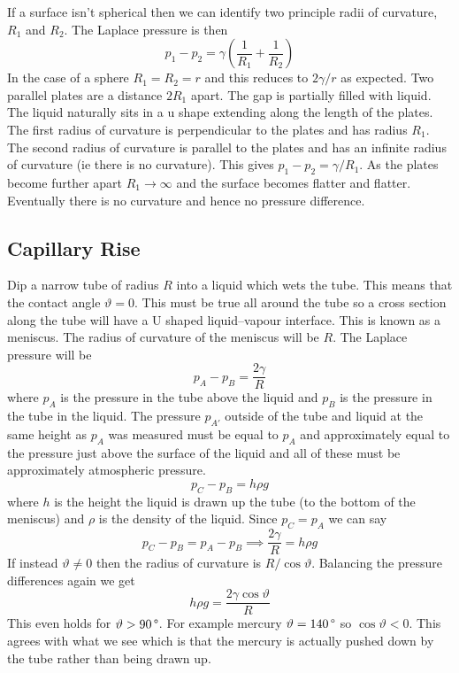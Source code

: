 \documentclass{article}
\begin{document}
    If a surface isn't spherical then we can identify two principle radii of curvature, \(R_1\) and \(R_2\).
    The Laplace pressure is then
    \[p_1 - p_2 = \gamma\left(\frac{1}{R_1} + \frac{1}{R_2}\right)\]
    In the case of a sphere \(R_1 = R_2 = r\) and this reduces to \(2\gamma/r\) as expected.
    Two parallel plates are a distance \(2R_1\) apart.
    The gap is partially filled with liquid.
    The liquid naturally sits in a u shape extending along the length of the plates.
    The first radius of curvature is perpendicular to the plates and has radius \(R_1\).
    The second radius of curvature is parallel to the plates and has an infinite radius of curvature (ie there is no curvature).
    This gives \(p_1 - p_2 = \gamma/R_1\).
    As the plates become further apart \(R_1\to\infty\) and the surface becomes flatter and flatter.
    Eventually there is no curvature and hence no pressure difference.
    
    \subsection{Capillary Rise}
    Dip a narrow tube of radius \(R\) into a liquid which wets the tube.
    This means that the contact angle \(\vartheta = 0\).
    This must be true all around the tube so a cross section along the tube will have a U shaped liquid--vapour interface.
    This is known as a meniscus.
    The radius of curvature of the meniscus will be \(R\).
    The Laplace pressure will be
    \[p_A - p_B = \frac{2\gamma}{R}\]
    where \(p_A\) is the pressure in the tube above the liquid and \(p_B\) is the pressure in the tube in the liquid.
    The pressure \(p_{A'}\) outside of the tube and liquid at the same height as \(p_A\) was measured must be equal to \(p_A\) and approximately equal to the pressure just above the surface of the liquid and all of these must be approximately atmospheric pressure.
    \[p_C - p_B = h\rho g\]
    where \(h\) is the height the liquid is drawn up the tube (to the bottom of the meniscus) and \(\rho\) is the density of the liquid.
    Since \(p_C = p_A\) we can say
    \[p_C - p_B = p_A - p_B \implies \frac{2\gamma}{R} = h\rho g\]
    If instead \(\vartheta\ne 0\) then the radius of curvature is \(R/\cos\vartheta\).
    Balancing the pressure differences again we get
    \[h\rho g = \frac{2\gamma\cos\vartheta}{R}\]
    This even holds for \(\vartheta > \SI{90}{\SIUnitSymbolDegree}\).
    For example mercury \(\vartheta = \SI{140}{\SIUnitSymbolDegree}\) so \(\cos\vartheta < 0\).
    This agrees with what we see which is that the mercury is actually pushed down by the tube rather than being drawn up.
    
\end{document}
